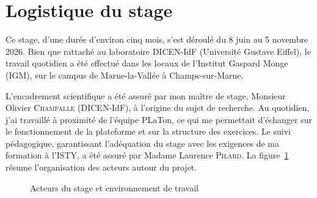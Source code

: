 \documentclass[12pt,a4paper,oneside]{report}
\begin{document}
\section{Logistique du stage}


Ce stage, d'une durée d'environ cinq mois, s'est déroulé du 8 juin au 5 novembre
2026. Bien que rattaché au laboratoire DICEN-IdF (Université Gustave
Eiffel), le travail quotidien a été effectué dans les locaux de l'Institut
Gaspard Monge (IGM), sur le campus de Marne-la-Vallée à Champs-sur-Marne.

L'encadrement scientifique a été assuré par mon maître de stage, Monsieur
Olivier \textsc{Champalle} (DICEN-IdF), à l'origine du sujet de recherche.
Au quotidien, j'ai travaillé à proximité de l'équipe PLaTon, ce qui me
permettait d'échanger sur le fonctionnement de la plateforme et sur la
structure des exercices. Le suivi pédagogique, garantissant l'adéquation
du stage avec les exigences de ma formation à l'ISTY, a été assuré par
Madame Laurence \textsc{Pilard}. La figure~\ref{fig:acteurs} résume
l'organisation des acteurs autour du projet.


\begin{figure}[H]
    \centering
    \caption{Acteurs du stage et environnement de travail}
    \label{fig:acteurs}
\end{figure}
\end{document}
